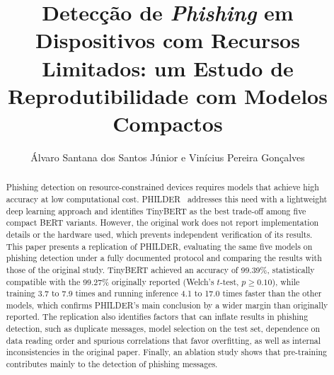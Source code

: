 \documentclass[12pt]{article}
\title{Detecção de \textit{Phishing} em Dispositivos com Recursos Limitados: um Estudo de Reprodutibilidade com Modelos Compactos}
\author{Álvaro Santana dos Santos Júnior \inst{1} e Vinícius Pereira Gonçalves \inst{1}}
\begin{document}
 

\maketitle

\begin{abstract}

        Phishing detection on resource-constrained devices requires models that achieve high accuracy at low computational cost. PHILDER~\cite{bispo2025philder} addresses this need with a lightweight deep learning approach and identifies TinyBERT as the best trade-off among five compact BERT variants. However, the original work does not report implementation details or the hardware used, which prevents independent verification of its results. This paper presents a replication of PHILDER, evaluating the same five models on phishing detection under a fully documented protocol and comparing the results with those of the original study. TinyBERT achieved an accuracy of 99.39\%, statistically compatible with the 99.27\% originally reported (Welch's $t$-test, $p \geq 0.10$), while training 3.7 to 7.9 times and running inference 4.1 to 17.0 times faster than the other models, which confirms PHILDER's main conclusion by a wider margin than originally reported. The replication also identifies factors that can inflate results in phishing detection, such as duplicate messages, model selection on the test set, dependence on data reading order and spurious correlations that favor overfitting, as well as internal inconsistencies in the original paper. Finally, an ablation study shows that pre-training contributes mainly to the detection of phishing messages.

\end{abstract}
     
\end{document}
